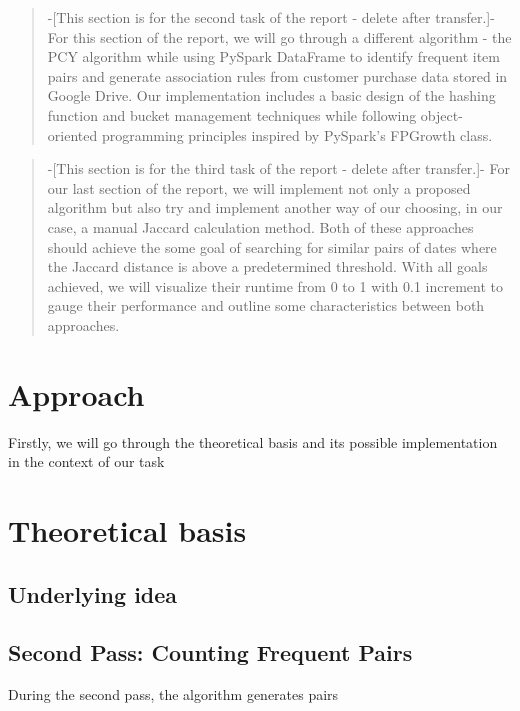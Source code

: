 \documentclass{article}
\begin{document}
\begin{abstract}
-[This section is for the second task of the report - delete after transfer.]-
For this section of the report, we will go through a different algorithm - the PCY algorithm while using PySpark DataFrame to identify frequent item pairs and generate association rules from customer purchase data stored in Google Drive. Our implementation includes a basic design of the hashing function and bucket management techniques while following object-oriented programming principles inspired by PySpark's FPGrowth class.



\end{abstract}

\begin{abstract}
-[This section is for the third task of the report - delete after transfer.]-
For our last section of the report, we will implement not only a proposed algorithm but also try and implement another way of our choosing, in our case, a manual Jaccard calculation method. Both of these approaches should achieve the some goal of searching for similar pairs of dates where the Jaccard distance is above a predetermined threshold. With all goals achieved, we will visualize their runtime from 0 to 1 with 0.1 increment to gauge their performance and outline some characteristics between both approaches.


\end{abstract}




\section{Approach}
Firstly, we will go through the theoretical basis and its possible implementation in the context of our task

\section{Theoretical basis}

\subsection{Underlying idea}


\subsection{}


\subsection{Second Pass: Counting Frequent Pairs}
During the second pass, the algorithm generates pairs 
\end{document}

